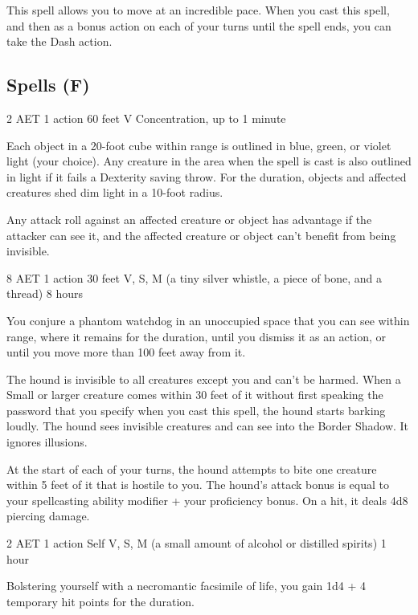 This spell allows you to move at an incredible pace. When you cast this spell, and then as a bonus action on each of your turns until the spell ends, you can take the Dash action.

\subsection{Spells (F)}


{2 AET}
{1 action}
{60 feet}
{V}
{Concentration, up to 1 minute}

Each object in a 20-foot cube within range is outlined in blue, green, or violet light (your choice). Any creature in the area when the spell is cast is also outlined in light if it fails a Dexterity saving throw. For the duration, objects and affected creatures shed dim light in a 10-foot radius.

Any attack roll against an affected creature or object has advantage if the attacker can see it, and the affected creature or object can't benefit from being invisible.


{8 AET}
{1 action}
{30 feet}
{V, S, M (a tiny silver whistle, a piece of bone, and a thread)}
{8 hours}

You conjure a phantom watchdog in an unoccupied space that you can see within range, where it remains for the duration, until you dismiss it as an action, or until you move more than 100 feet away from it.

The hound is invisible to all creatures except you and can't be harmed. When a Small or larger creature comes within 30 feet of it without first speaking the password that you specify when you cast this spell, the hound starts barking loudly. The hound sees invisible creatures and can see into the Border Shadow. It ignores illusions.

At the start of each of your turns, the hound attempts to bite one creature within 5 feet of it that is hostile to you. The hound's attack bonus is equal to your spellcasting ability modifier + your proficiency bonus. On a hit, it deals 4d8 piercing damage.


{2 AET}
{1 action}
{Self}
{V, S, M (a small amount of alcohol or distilled spirits)}
{1 hour}

Bolstering yourself with a necromantic facsimile of life, you gain 1d4 + 4 temporary hit points for the duration.

